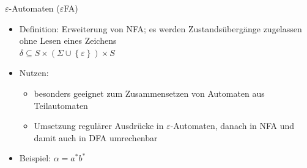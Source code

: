 \begin{frame}{$\varepsilon$-Automaten ($\varepsilon$FA)}
	\begin{itemize}
		\item Definition: Erweiterung von NFA; es werden Zustandsübergänge zugelassen ohne Lesen eines Zeichens\\
		\quad $\delta\subseteq S \times \left(\Sigma \cup \left\{\varepsilon\right\}\right) \times S$
		\item Nutzen:
		\begin{itemize}
			\item besonders geeignet zum Zusammensetzen von Automaten aus Teilautomaten
			\item Umsetzung regulärer Ausdrücke in $\varepsilon$-Automaten, danach in NFA und damit auch in DFA umrechenbar
		\end{itemize}
		\item Beispiel: $\alpha=a^*b^*$
	\end{itemize}
\end{frame}

